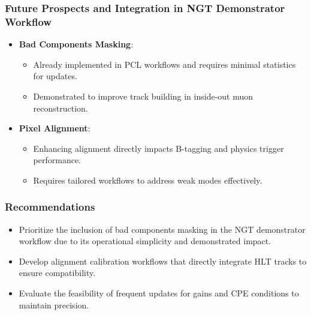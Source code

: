 \subsubsection*{Future Prospects and Integration in NGT Demonstrator Workflow}
\begin{itemize}
    \item \textbf{Bad Components Masking}:
    \begin{itemize}
        \item Already implemented in PCL workflows and requires minimal statistics for updates.
        \item Demonstrated to improve track building in inside-out muon reconstruction.
    \end{itemize}
    \item \textbf{Pixel Alignment}:
    \begin{itemize}
        \item Enhancing alignment directly impacts B-tagging and physics trigger performance.
        \item Requires tailored workflows to address weak modes effectively.
    \end{itemize}
\end{itemize}

\subsubsection*{Recommendations}
\begin{itemize}
    \item Prioritize the inclusion of bad components masking in the NGT demonstrator workflow due to its operational simplicity and demonstrated impact.
    \item Develop alignment calibration workflows that directly integrate HLT tracks to ensure compatibility.
    \item Evaluate the feasibility of frequent updates for gains and CPE conditions to maintain precision.
\end{itemize}